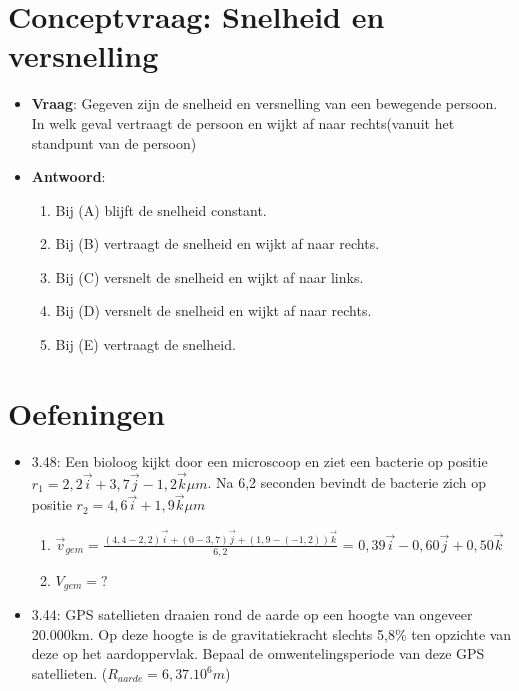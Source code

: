 \documentclass[12pt]{report}
\begin{document}
\section{Conceptvraag: Snelheid en versnelling}
\begin{itemize}
\item {\textbf{Vraag}: Gegeven zijn de snelheid en versnelling van een bewegende persoon. In welk geval vertraagt de persoon en wijkt af naar rechts(vanuit het standpunt van de persoon)}
\item {\textbf{Antwoord}: \begin{enumerate}
    \item {Bij (A) blijft de snelheid constant.}
    \item {Bij (B) vertraagt de snelheid en wijkt af naar rechts.}
    \item {Bij (C) versnelt de snelheid en wijkt af naar links.}
    \item {Bij (D) versnelt de snelheid en wijkt af naar rechts.}
      \item {Bij (E) vertraagt de snelheid.}
    \end{enumerate}}
\end{itemize}

\section{Oefeningen}
\begin{itemize}[label={}]
 \item 3.48: Een bioloog kijkt door een microscoop en ziet een bacterie op positie 
 $r_1 = 2,2\overrightarrow{i} + 3,7\overrightarrow{j} - 1,2\overrightarrow{k} \mu m$. Na
 6,2 seconden bevindt de bacterie zich op positie 
 $r_2 = 4,6\overrightarrow{i} + 1,9\overrightarrow{k} \mu m$
 \begin{enumerate}[label={}]
  \item $\overrightarrow{v}_{gem} = \frac{(4,4 - 2,2)\overrightarrow{i} + (0 - 3,7)\overrightarrow{j}
  + (1,9 - (-1,2))\overrightarrow{k}}{6,2}$ = $0,39\overrightarrow{i} - 0,60\overrightarrow{j} + 0,50\overrightarrow{k}$ 
  \item $V_{gem} = ?$
 \end{enumerate}
 \item 3.44: GPS satellieten draaien rond de aarde op een hoogte van ongeveer 20.000km. Op deze 
 hoogte is de gravitatiekracht slechts 5,8\% ten opzichte van deze op het aardoppervlak. Bepaal
 de omwentelingsperiode van deze GPS satellieten. ($R_{aarde} = 6,37 . 10^6m$)

\end{itemize}
\end{document}
